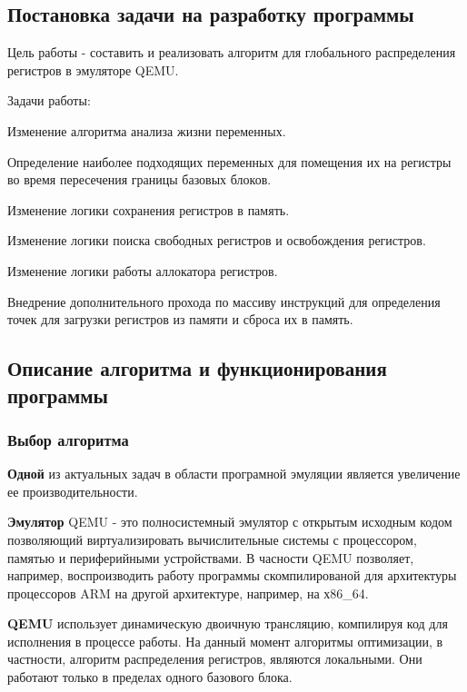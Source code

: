 \subsection{Постановка задачи на разработку программы}
    Цель работы - составить и реализовать алгоритм для глобального распределения регистров в эмуляторе QEMU.

\bigskip
Задачи работы:

\smallskip
\begin{my_enumerate}
\item Изменение алгоритма анализа жизни переменных.
\item Определение наиболее подходящих переменных для помещения их на регистры во время пересечения границы базовых блоков.
\item Изменение логики сохранения регистров в память.
\item Изменение логики поиска свободных регистров и освобождения регистров.
\item Изменение логики работы аллокатора регистров.
\item Внедрение дополнительного прохода по массиву инструкций для определения точек для загрузки регистров из памяти и сброса их в память.
\end{my_enumerate}


\subsection{Описание алгоритма и функционирования программы}


\subsubsection{Выбор алгоритма}

\textbf{Одной}
из актуальных задач в области програмной эмуляции является увеличение ее производительности.

\textbf{Эмулятор}
QEMU - это полносистемный эмулятор с открытым исходным кодом позволяющий виртуализировать вычислительные системы с процессором, памятью и периферийными устройствами. В часности QEMU позволяет, например, воспроизводить работу программы скомпилированой для архитектуры процессоров ARM на другой архитектуре, например, на х86\_64.

\textbf{QEMU}
использует динамическую двоичную трансляцию, компилируя код для исполнения в процессе работы. На данный момент алгоритмы оптимизации, в частности, алгоритм распределения регистров, являются локальными. Они работают только
в пределах одного базового блока.

